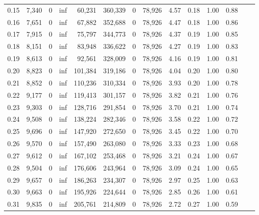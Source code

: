 \begin{tabular}{rrrrrrrrrrrrrr}
0.15 &  7,340 &      0 &      inf &   60,231 &  360,339 &       0 &  78,926 &  4.57 &  0.18 &  1.00 &      0.88 \\
0.16 &  7,651 &      0 &      inf &   67,882 &  352,688 &       0 &  78,926 &  4.47 &  0.18 &  1.00 &      0.86 \\
0.17 &  7,915 &      0 &      inf &   75,797 &  344,773 &       0 &  78,926 &  4.37 &  0.19 &  1.00 &      0.85 \\
0.18 &  8,151 &      0 &      inf &   83,948 &  336,622 &       0 &  78,926 &  4.27 &  0.19 &  1.00 &      0.83 \\
0.19 &  8,613 &      0 &      inf &   92,561 &  328,009 &       0 &  78,926 &  4.16 &  0.19 &  1.00 &      0.81 \\
0.20 &  8,823 &      0 &      inf &  101,384 &  319,186 &       0 &  78,926 &  4.04 &  0.20 &  1.00 &      0.80 \\
0.21 &  8,852 &      0 &      inf &  110,236 &  310,334 &       0 &  78,926 &  3.93 &  0.20 &  1.00 &      0.78 \\
0.22 &  9,177 &      0 &      inf &  119,413 &  301,157 &       0 &  78,926 &  3.82 &  0.21 &  1.00 &      0.76 \\
0.23 &  9,303 &      0 &      inf &  128,716 &  291,854 &       0 &  78,926 &  3.70 &  0.21 &  1.00 &      0.74 \\
0.24 &  9,508 &      0 &      inf &  138,224 &  282,346 &       0 &  78,926 &  3.58 &  0.22 &  1.00 &      0.72 \\
0.25 &  9,696 &      0 &      inf &  147,920 &  272,650 &       0 &  78,926 &  3.45 &  0.22 &  1.00 &      0.70 \\
0.26 &  9,570 &      0 &      inf &  157,490 &  263,080 &       0 &  78,926 &  3.33 &  0.23 &  1.00 &      0.68 \\
0.27 &  9,612 &      0 &      inf &  167,102 &  253,468 &       0 &  78,926 &  3.21 &  0.24 &  1.00 &      0.67 \\
0.28 &  9,504 &      0 &      inf &  176,606 &  243,964 &       0 &  78,926 &  3.09 &  0.24 &  1.00 &      0.65 \\
0.29 &  9,657 &      0 &      inf &  186,263 &  234,307 &       0 &  78,926 &  2.97 &  0.25 &  1.00 &      0.63 \\
0.30 &  9,663 &      0 &      inf &  195,926 &  224,644 &       0 &  78,926 &  2.85 &  0.26 &  1.00 &      0.61 \\
0.31 &  9,835 &      0 &      inf &  205,761 &  214,809 &       0 &  78,926 &  2.72 &  0.27 &  1.00 &      0.59 \\

\end{tabular}

